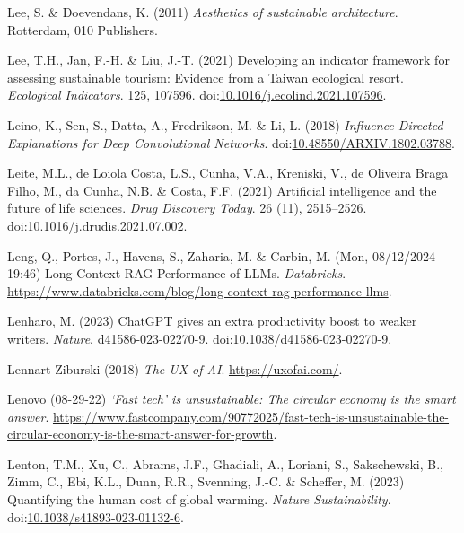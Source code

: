 \documentclass[
  letterpaper,
  DIV=11,
  numbers=noendperiod]{scrartcl}
\newlength{\cslhangindent}
\newenvironment{CSLReferences}[2] %
 {\begin{list}{}{%
  \setlength{\itemindent}{0pt}
  \setlength{\leftmargin}{0pt}
  \setlength{\parsep}{0pt}
  \ifodd #1
   \setlength{\leftmargin}{\cslhangindent}
   \setlength{\itemindent}{-1\cslhangindent}
  \fi
  \setlength{\itemsep}{#2\baselineskip}}}
 {\end{list}}
\begin{document}
\begin{CSLReferences}{0}{1}
Lee, S. \& Doevendans, K. (2011) \emph{Aesthetics of sustainable
architecture}. Rotterdam, 010 Publishers.

Lee, T.H., Jan, F.-H. \& Liu, J.-T. (2021) Developing an indicator
framework for assessing sustainable tourism: {Evidence} from a {Taiwan}
ecological resort. \emph{Ecological Indicators}. 125, 107596.
doi:\href{https://doi.org/10.1016/j.ecolind.2021.107596}{10.1016/j.ecolind.2021.107596}.

Leino, K., Sen, S., Datta, A., Fredrikson, M. \& Li, L. (2018)
\emph{Influence-{Directed Explanations} for {Deep Convolutional
Networks}}.
doi:\href{https://doi.org/10.48550/ARXIV.1802.03788}{10.48550/ARXIV.1802.03788}.

Leite, M.L., de Loiola Costa, L.S., Cunha, V.A., Kreniski, V., de
Oliveira Braga Filho, M., da Cunha, N.B. \& Costa, F.F. (2021)
Artificial intelligence and the future of life sciences. \emph{Drug
Discovery Today}. 26 (11), 2515--2526.
doi:\href{https://doi.org/10.1016/j.drudis.2021.07.002}{10.1016/j.drudis.2021.07.002}.

Leng, Q., Portes, J., Havens, S., Zaharia, M. \& Carbin, M. (Mon,
08/12/2024 - 19:46) Long {Context RAG Performance} of {LLMs}.
\emph{Databricks}.
\url{https://www.databricks.com/blog/long-context-rag-performance-llms}.

Lenharo, M. (2023) {ChatGPT} gives an extra productivity boost to weaker
writers. \emph{Nature}. d41586-023-02270-9.
doi:\href{https://doi.org/10.1038/d41586-023-02270-9}{10.1038/d41586-023-02270-9}.

Lennart Ziburski (2018) \emph{The {UX} of {AI}}.
\url{https://uxofai.com/}.

Lenovo (08-29-22) \emph{{`{Fast} tech'} is unsustainable: {The} circular
economy is the smart answer}.
\url{https://www.fastcompany.com/90772025/fast-tech-is-unsustainable-the-circular-economy-is-the-smart-answer-for-growth}.

Lenton, T.M., Xu, C., Abrams, J.F., Ghadiali, A., Loriani, S.,
Sakschewski, B., Zimm, C., Ebi, K.L., Dunn, R.R., Svenning, J.-C. \&
Scheffer, M. (2023) Quantifying the human cost of global warming.
\emph{Nature Sustainability}.
doi:\href{https://doi.org/10.1038/s41893-023-01132-6}{10.1038/s41893-023-01132-6}.


\end{CSLReferences}
\end{document}
